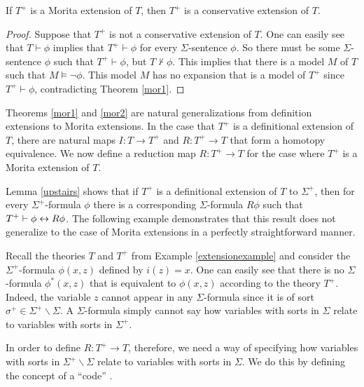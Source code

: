 \begin{thm}[Barrett] If $T^+$ is a Morita extension of $T$, then $T^+$
  is a conservative extension of $T$. \label{mor2}
\end{thm}

\begin{proof}
  Suppose that $T^+$ is not a conservative extension of $T$. One can
  easily see that $T\vdash\phi$ implies that $T^+\vdash\phi$ for every
  $\Sigma$-sentence $\phi$. So there must be some $\Sigma$-sentence
  $\phi$ such that $T^+\vdash\phi$, but $T\not\vdash\phi$. This
  implies that there is a model $M$ of $T$ such that
  $M\vDash\lnot\phi$. This model $M$ has no expansion that is a model
  of $T^+$ since $T^+\vdash\phi$, contradicting Theorem \ref{mor1}.
\end{proof}

Theorems \ref{mor1} and \ref{mor2} are natural generalizations from
definition extensions to Morita extensions.  In the case that $T^+$ is
a definitional extension of $T$, there are natural maps $I:T\to T^+$
and $R:T^+\to T$ that form a homotopy equivalence.  We now define a
reduction map $R:T^+\to T$ for the case where $T^+$ is a Morita
extension of $T$.

Lemma \ref{upstairs} shows that if $T^+$ is a definitional extension
of $T$ to $\Sigma^+$, then for every $\Sigma^+$-formula $\phi$ there
is a corresponding $\Sigma$-formula $R\phi$ such that
$T^+\vdash \phi\leftrightarrow R\phi$.  The following example demonstrates that
this result does not generalize to the case of Morita extensions in a
perfectly straightforward manner.

\begin{example} Recall the theories $T$ and $T^+$ from Example
  \ref{extensionexample} and consider the $\Sigma^+$-formula
  $\phi(x, z)$ defined by $i(z)=x$. One can easily see that there is
  no $\Sigma$-formula $\phi^*(x, z)$ that is equivalent to
  $\phi(x, z)$ according to the theory $T^+$. Indeed, the variable $z$
  cannot appear in any $\Sigma$-formula since it is of sort
  $\sigma^+\in\Sigma^+\backslash\Sigma$. A $\Sigma$-formula simply
  cannot say how variables with sorts in $\Sigma$ relate to variables
  with sorts in $\Sigma^+$.
\end{example}

In order to define $R:T^+\to T$, therefore, we need a way of
specifying how variables with sorts in $\Sigma^+\backslash\Sigma$
relate to variables with sorts in $\Sigma$.  We do this by defining
the concept of a ``code'' \cite[see][]{szczerba1977}.

